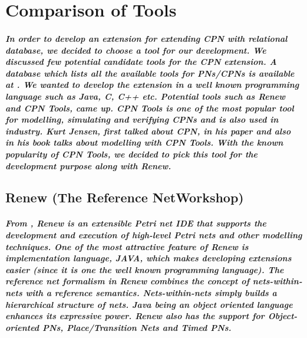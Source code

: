\graphicspath{{./images/Appendix/Comparison_Tools/}}
\chapter{Comparison of Tools}
\label{ch:app_comp_tools}
\paragraph*{\textnormal{In order to develop an extension for extending CPN with relational database, we decided to choose a tool for our development. We discussed few potential candidate tools for the CPN extension. A database which lists all the available tools for PNs/CPNs is available at \cite{Tools_WIKI}. We wanted to develop the extension in a well known programming language such as Java, C, C++ etc. Potential tools such as Renew \cite{Renew_Paper} and CPN Tools, came up. CPN Tools is one of the most popular tool for modelling, simulating and verifying CPNs and is also used in industry\cite{CPN_Industrial_Use}. Kurt Jensen, first talked about CPN, in his paper \cite{Jensen2007} and also in his book \cite{Jensen_CPN_Book_ML} talks about modelling with CPN Tools. With the known popularity of CPN Tools, we decided to pick this tool for the development purpose along with Renew.}}

\section{Renew (The Reference NetWorkshop)}
\label{sec:app_comp_tools_renew}
\paragraph*{\textnormal{From \cite{Renew_Paper}, Renew is an extensible Petri net IDE that supports the development and execution of high-level Petri nets and other modelling techniques. One of the most attractive feature of Renew is implementation language, JAVA, which makes developing extensions easier (since it is one the well known programming language). The reference net formalism in Renew combines the concept of nets-within-nets with a reference semantics. Nets-within-nets simply builds a hierarchical structure of nets. Java being an object oriented language enhances its expressive power. Renew also has the support for Object-oriented PNs, Place/Transition Nets and Timed PNs.}}

